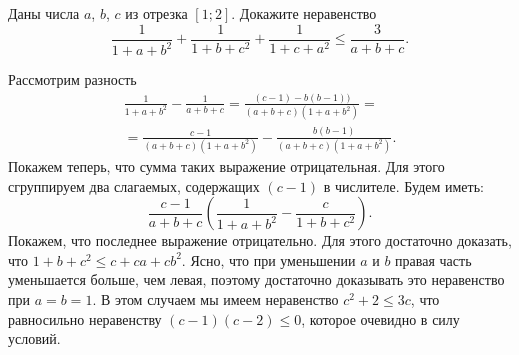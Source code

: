 \problem{}
Даны числа $a$, $b$, $c$ из отрезка $[1; 2]$.
Докажите неравенство
\[
    \frac{1}{1 + a + b^2}
    +
    \frac{1}{1 + b + c^2}
    +
    \frac{1}{1 + c + a^2}
\leq
    \frac{3}{a + b + c}
.\]

\solution
Рассмотрим разность 
\begin{gather*}
    \frac{1}{1 + a + b^2} - \frac{1}{a + b + c}
=
    \frac{(c - 1) - b (b - 1))}{(a + b + c)(1 + a + b^2)}
=\\=
    \frac{c - 1}{(a + b + c)(1 + a + b^2)}
    -
    \frac{b (b - 1)}{(a + b + c)(1 + a + b^2)}
.\end{gather*}
Покажем теперь, что сумма таких выражение отрицательная.
Для этого сгруппируем два слагаемых, содержащих $(c - 1)$ в числителе.
Будем иметь:
\[
    \frac{c - 1}{a + b + c}
    \left(
        \frac{1}{1 + a + b^2}
        -
        \frac{c}{1 + b + c^2}
    \right)
.\]
Покажем, что последнее выражение отрицательно.
Для этого достаточно доказать, что $1 + b + c^2 \leq c + c a + c b^2$.
Ясно, что при уменьшении $a$ и $b$ правая часть уменьшается больше, чем левая,
поэтому достаточно доказывать это неравенство при $a = b = 1$.
В этом случаем мы имеем неравенство $c^2 + 2 \leq 3 c$, что равносильно
неравенству $(c - 1) (c - 2) \leq 0$, которое очевидно в силу условий.

\endproblem
